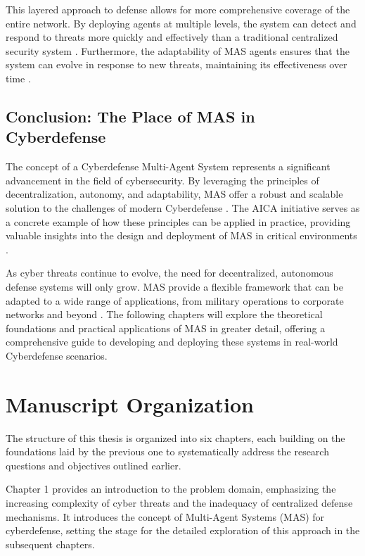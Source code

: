 This layered approach to defense allows for more comprehensive coverage of the entire network. By deploying agents at multiple levels, the system can detect and respond to threats more quickly and effectively than a traditional centralized security system \cite{bou-harb2017cyber}. Furthermore, the adaptability of MAS agents ensures that the system can evolve in response to new threats, maintaining its effectiveness over time \cite{haider2020artificial}.

\subsection{Conclusion: The Place of MAS in Cyberdefense}

The concept of a Cyberdefense Multi-Agent System represents a significant advancement in the field of cybersecurity. By leveraging the principles of decentralization, autonomy, and adaptability, MAS offer a robust and scalable solution to the challenges of modern Cyberdefense \cite{kolias2011swarm}. The AICA initiative serves as a concrete example of how these principles can be applied in practice, providing valuable insights into the design and deployment of MAS in critical environments \cite{bou-harb2014cyber}.

As cyber threats continue to evolve, the need for decentralized, autonomous defense systems will only grow. MAS provide a flexible framework that can be adapted to a wide range of applications, from military operations to corporate networks and beyond \cite{jahanbin2013computer}. The following chapters will explore the theoretical foundations and practical applications of MAS in greater detail, offering a comprehensive guide to developing and deploying these systems in real-world Cyberdefense scenarios.



\section{Manuscript Organization}

The structure of this thesis is organized into six chapters, each building on the foundations laid by the previous one to systematically address the research questions and objectives outlined earlier.

Chapter 1 provides an introduction to the problem domain, emphasizing the increasing complexity of cyber threats and the inadequacy of centralized defense mechanisms. It introduces the concept of Multi-Agent Systems (MAS) for cyberdefense, setting the stage for the detailed exploration of this approach in the subsequent chapters.

